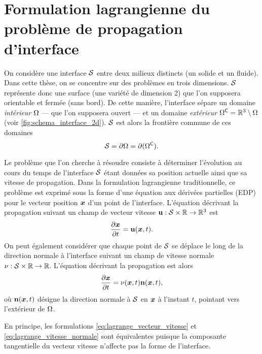\section{Formulation lagrangienne du problème de propagation d'interface}
On considère une interface $\mathcal{S}$ entre deux milieux distincts (\eg un solide et un fluide).
Dans cette thèse, on se concentre sur des problèmes en trois dimensions. 
$\mathcal{S}$ représente donc une surface (\ie une variété de dimension 2) que l’on supposera orientable et fermée (\ie sans bord).
De cette manière, l'interface sépare un domaine \textit{intérieur} $\Omega$ --- que l'on supposera ouvert --- et un domaine \textit{extérieur} $\Omega^\mathsf{C} = \mathbb{R}^3 \setminus \Omega$ (voir \autoref{fig:schema_interface_2d}). 
$\mathcal{S}$ est alors la frontière commune de ces domaines
\begin{equation}
	\mathcal{S} = \partial \Omega = \partial (\Omega^\mathsf{C}).
\end{equation}
\par
Le problème que l'on cherche à résoudre consiste à déterminer l’évolution au cours du temps de l'interface $\mathcal{S}$ étant données sa position actuelle ainsi que sa vitesse de propagation.
Dans la formulation lagrangienne traditionnelle, ce problème est exprimé sous la forme d'une équation aux dérivées partielles (EDP) pour le vecteur position $\bm{x}$ d'un point de l'interface.
L'équation décrivant la propagation suivant un champ de vecteur vitesse $\mathbf{u} : \mathcal{S} \times \mathbb{R} \to \mathbb{R}^3$ est
\begin{equation}
	\frac{\partial \bm{x}}{\partial t} = \mathbf{u}(\bm{x},t).
	\label{eq:lagrange_vecteur_vitesse}
\end{equation}
On peut également considérer que chaque point de $\mathcal{S}$ se déplace le long de la direction normale à l'interface suivant un champ de vitesse normale $\nu : \mathcal{S} \times \mathbb{R} \to \mathbb{R}$. 
L'équation décrivant la propagation est alors
\begin{equation}
	\frac{\partial \bm{x}}{\partial t} = \nu(\bm{x},t) \mathbf{n}(\bm{x},t),
	\label{eq:lagrange_vitesse_normale}
\end{equation}
où $\mathbf{n}(\bm{x},t)$ désigne la direction normale à $\mathcal{S}$ en $\bm{x}$ à l'instant $t$, pointant vers l'extérieur de $\Omega$.
\par\bigskip
En principe, les formulations \eqref{eq:lagrange_vecteur_vitesse} et \eqref{eq:lagrange_vitesse_normale} sont équivalentes puisque la composante tangentielle du vecteur vitesse n'affecte pas la forme de l'interface. 
